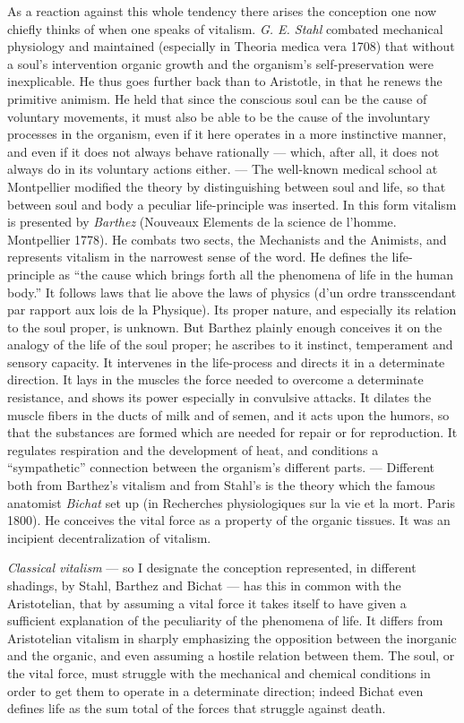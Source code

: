 \documentclass[12pt,a4paper,openany]{book}
\newcommand{\opage}[1]{\marginnote{\footnotesize\textit{[#1]}}}
\begin{document}
As a reaction against this whole tendency there arises the conception one now
chiefly thinks of when one speaks of vitalism. \emph{G. E. Stahl} combated
mechanical physiology and maintained (especially in Theoria medica vera
1708) that without a soul's intervention organic growth and the organism's
self-preservation were inexplicable. He thus goes further back than to
Aristotle, in that he renews the primitive animism. He held that since the
conscious soul can be the cause of voluntary movements, it must also be able to
be the cause of the involuntary processes in the organism, even if it here
operates in a more instinctive manner, and even if it does not
\opage{43}always behave rationally --- which, after all, it does not always do in its
voluntary actions either. --- The well-known medical school at Montpellier
modified the theory by distinguishing between soul and life, so that between
soul and body a peculiar life-principle was inserted. In this form vitalism is
presented by \emph{Barthez} (Nouveaux Elements de la science de
l'homme. Montpellier 1778). He combats two sects, the Mechanists and the
Animists, and represents vitalism in the narrowest sense of the word. He defines
the life-principle as ``the cause which brings forth all the phenomena of life
in the human body.'' It follows laws that lie above the laws of physics
(d'un ordre transscendant par rapport aux lois
de la Physique). Its
proper nature, and especially its relation to the soul proper, is unknown. But
Barthez plainly enough conceives it on the analogy of the life of the soul proper;
he ascribes to it instinct, temperament and sensory capacity. It intervenes in the
life-process and directs it in a determinate direction. It lays in the muscles
the force needed to overcome a determinate resistance, and shows its power
especially in convulsive attacks. It dilates the muscle fibers in the ducts of
milk and of semen, and it acts upon the humors, so that the substances are
formed which are needed for repair or for reproduction. It regulates respiration
and the development of heat, and conditions a ``sympathetic'' connection between
the organism's different parts. --- Different both from Barthez's vitalism and
from Stahl's is the theory which the famous anatomist \emph{Bichat} set up (in
Recherches physiologiques sur la vie et la mort.
Paris 1800). He
conceives the vital force as a property of the organic tissues. It was an
incipient decentralization of vitalism.

\emph{Classical vitalism} --- so I designate the conception represented, in
different shadings, by Stahl, Barthez and Bichat --- has this in common with the
Aristotelian, that by assuming a vital force it takes itself to have given a
sufficient explanation of the peculiarity of the phenomena of life. It differs
from Aristotelian vitalism in sharply emphasizing the opposition between the
inorganic and the organic, and even assuming a hostile relation
\opage{44}between them. The soul, or the vital force, must struggle with the mechanical
and chemical conditions in order to get them to operate in a determinate
direction; indeed Bichat even defines life as the sum total of the forces that
struggle against death.
\end{document}
